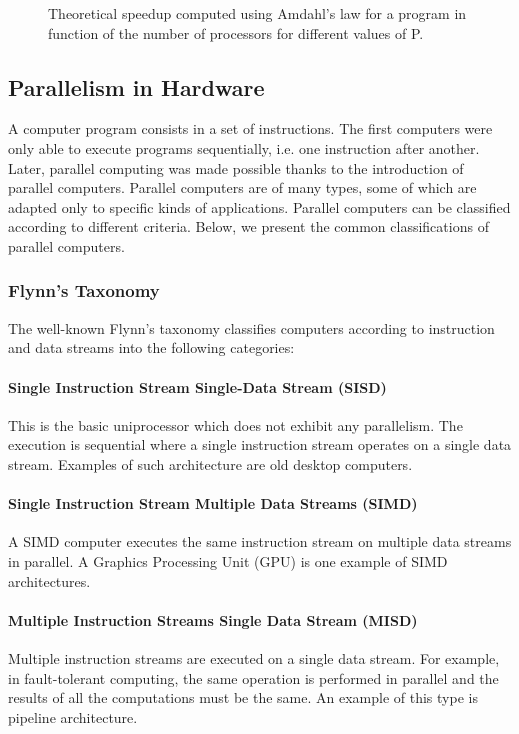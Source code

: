 \begin{figure}[phbt]
\centering
\captionsetup{justification=centering}

\caption{Theoretical speedup computed using Amdahl’s law for a program in function of the number of processors for different values of P.}
\label{fig:amdhal}
\end{figure} 

\subsection{Parallelism in Hardware}

A computer program consists in a set of instructions. The first computers were only able to execute programs sequentially, i.e. one instruction after another. Later, parallel computing was made possible thanks to the introduction of parallel computers. Parallel computers are of many types, some of which are adapted only to specific kinds of applications. Parallel computers can be classified according to different criteria. Below, we present the common classifications of parallel computers. 

\subsubsection{Flynn's Taxonomy}

The well-known Flynn's taxonomy \cite{flynn:1972} classifies computers according to instruction and data streams into the following categories:

\paragraph{Single Instruction Stream Single-Data Stream (SISD)} This is the basic uniprocessor which does not exhibit any parallelism. The execution is sequential where a single instruction stream operates on a single data stream. Examples of such architecture are old desktop computers.

\paragraph{Single Instruction Stream Multiple Data Streams (SIMD)} A SIMD computer executes the same instruction stream on multiple data streams in parallel. A Graphics Processing Unit (GPU) is one example of SIMD architectures.

\paragraph{Multiple Instruction Streams Single Data Stream (MISD)} Multiple instruction streams are executed on a single data stream. For example, in fault-tolerant computing, the same operation is performed in parallel and the results of all the computations must be the same. An example of this type is pipeline architecture.


